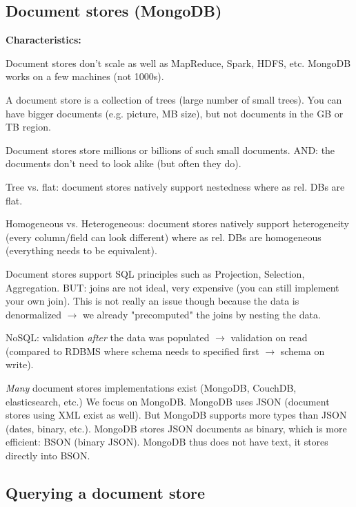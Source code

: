 \documentclass[11pt,oneside,a4paper]{article}
\begin{document}
\subsection{Document stores (MongoDB)}

\textbf{Characteristics:}

\begin{compactitem}
\item Document stores don't scale as well as MapReduce, Spark, HDFS, etc. MongoDB works on a few machines (not 1000s). 
\item A document store is a collection of trees (large number of small trees). You can have bigger documents (e.g. picture, MB size), but not documents in the GB or TB region.
\item Document stores store millions or billions of such small documents. AND: the documents don't need to look alike (but often they do).
\item Tree vs. flat: document stores natively support nestedness where as rel. DBs are flat.
\item Homogeneous vs. Heterogeneous: document stores natively support heterogeneity (every column/field can look different) where as rel. DBs are homogeneous (everything needs to be equivalent).
\item Document stores support SQL principles such as Projection, Selection, Aggregation. BUT: joins are not ideal, very expensive (you can still implement your own join). This is not really an issue though because the data is denormalized $\rightarrow$ we already "precomputed" the joins by nesting the data.
\item NoSQL: validation \textit{after} the data was populated $\rightarrow$ validation on read (compared to RDBMS where schema needs to specified first $\rightarrow$ schema on write).
\end{compactitem}

\textit{Many} document stores implementations exist (MongoDB, CouchDB, elasticsearch, etc.) We focus on MongoDB. MongoDB uses JSON (document stores using XML exist as well). But MongoDB supports more types than JSON (dates, binary, etc.). MongoDB stores JSON documents as binary, which is more efficient: BSON (binary JSON). MongoDB thus does not have text, it stores directly into BSON. 

\subsection{Querying a document store}
\end{document}

